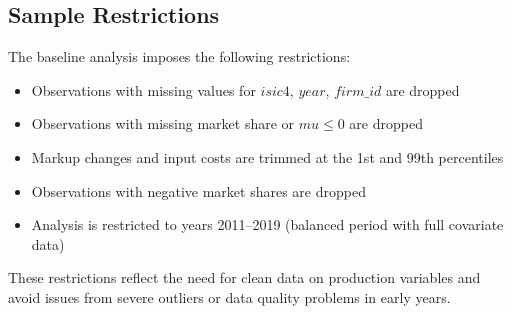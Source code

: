 \documentclass[12pt]{article}
\begin{document}
\subsection{Sample Restrictions}

The baseline analysis imposes the following restrictions:
\begin{itemize}
    \item Observations with missing values for $isic4$, $year$, $firm\_id$ are dropped
    \item Observations with missing market share or $mu \leq 0$ are dropped
    \item Markup changes and input costs are trimmed at the 1st and 99th percentiles
    \item Observations with negative market shares are dropped\
    \item Analysis is restricted to years 2011--2019 (balanced period with full covariate data)
\end{itemize}

These restrictions reflect the need for clean data on production variables and avoid issues from severe outliers or data quality problems in early years.
\end{document}
